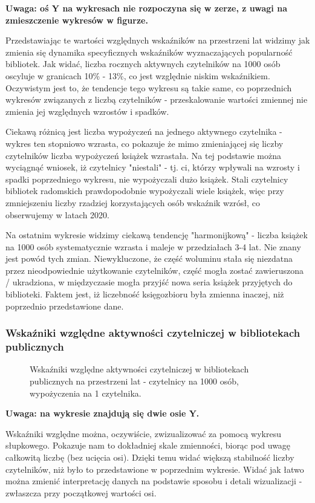 \documentclass[12pt]{article}
\begin{document}
\textbf{Uwaga: oś Y na wykresach nie rozpoczyna się w zerze, z uwagi na zmieszczenie wykresów w figurze.}

Przedstawiając te wartości względnych wskaźników na przestrzeni lat widzimy jak zmienia się dynamika specyficznych wskaźników 
wyznaczających popularność bibliotek. Jak widać, liczba rocznych aktywnych czytelników na 1000 osób oscyluje w granicach 10\% - 13\%, 
co jest względnie niskim wskaźnikiem. Oczywistym jest to, że tendencje tego wykresu są takie same, co poprzednich wykresów związanych z liczbą czytelników - 
przeskalowanie wartości zmiennej nie zmienia jej względnych wzrostów i spadków.

Ciekawą różnicą jest liczba wypożyczeń na jednego aktywnego czytelnika - wykres ten stopniowo wzrasta, co pokazuje że mimo zmieniającej się liczby czytelników
liczba wypożyczeń książek wzrastała. Na tej podstawie można wyciągnąć wniosek, iż czytelnicy "niestali" - tj. ci, którzy wpływali na wzrosty i spadki 
poprzedniego wykresu, nie wypożyczali dużo książek. Stali czytelnicy bibliotek radomskich prawdopodobnie wypożyczali wiele książek, więc przy zmniejszeniu
liczby rzadziej korzystających osób wskaźnik wzrósł, co obserwujemy w latach 2020.

Na ostatnim wykresie widzimy ciekawą tendencję "harmonijkową" - liczba książek na 1000 osób systematycznie wzrasta i maleje w przedziałach 3-4 lat. 
Nie znany jest powód tych zmian. Niewykluczone, że część woluminu stała się niezdatna przez nieodpowiednie użytkowanie czytelników, 
część mogła zostać zawieruszona / ukradziona, w międzyczasie mogła przyjść nowa seria książek przyjętych do biblioteki. Faktem jest, iż liczebność 
księgozbioru była zmienna inaczej, niż poprzednio przedstawione dane.

\subsubsection{Wskaźniki względne aktywności czytelniczej w bibliotekach publicznych}
\begin{figure}[H]
    
    \caption{Wskaźniki względne aktywności czytelniczej w bibliotekach publicznych na przestrzeni lat
     - czytelnicy na 1000 osób, wypożyczenia na 1 czytelnika.}
\end{figure}

\textbf{Uwaga: na wykresie znajdują się dwie osie Y.}

Wskaźniki względne można, oczywiście, zwizualizować za pomocą wykresu słupkowego. Pokazuje nam to dokładniej skale zmienności, biorąc pod uwagę 
całkowitą liczbę (bez ucięcia osi). Dzięki temu widać większą stabilność liczby czytelników, niż było to przedstawione w poprzednim wykresie. 
Widać jak łatwo można zmienić interpretację danych na podstawie sposobu i detali wizualizacji - zwłaszcza przy początkowej wartości osi.
\end{document}
